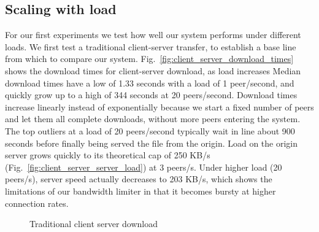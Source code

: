 \subsection{Scaling with load}

For our first experiments we test how well our system performs under different loads.
We first test a traditional client-server transfer, to establish a base line from which to compare 
our system. Fig.~\ref{fig:client_server_download_times} shows the download times for client-server 
download, as load increases Median download times have a low of 1.33 seconds with a load of 1 peer/second,
and quickly grow up to a high of 344 seconds at 20 peers/second. Download times increase linearly instead 
of exponentially because we start a fixed number of peers and let them all complete downloads, without more peers
entering the system. 
The top outliers at a load of 20 peers/second typically wait in line about 900 seconds before finally 
being served the file from the origin. Load on the origin server grows quickly to its theoretical cap of 250 KB/s (Fig.~\ref{fig:client_server_server_load}) 
at 3 peers/s. Under higher load (20 peers/s), server speed actually decreases to 203 KB/s, which 
shows the limitations of our bandwidth limiter in that it becomes bursty at higher connection rates. 

\begin{figure}
  \begin{center}
    \caption{Traditional client server download}  
  \end{center}
\end{figure}

